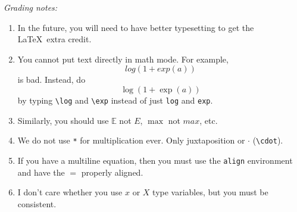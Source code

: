 \documentclass[10pt]{article}
\theoremstyle{definition}
\newcommand{\E}{\mathbb E}
\begin{document}
\noindent
\textit{Grading notes:}
\begin{enumerate}
    \item
In the future, you will need to have better typesetting to get the \LaTeX\ extra credit.
\item
    You cannot put text directly in math mode.  For example,
        \begin{equation}
            log(1+exp(a))
        \end{equation}
        is bad.  
        Instead, do
        \begin{equation}
            \log(1+\exp(a))
        \end{equation}
        by typing \texttt{\textbackslash log} and \texttt{\textbackslash exp} instead of just \texttt{log} and \texttt{exp}.
    \item
        Similarly, you should use $\E$ not $E$, $\max$ not $max$, etc.
    \item
        We do not use \texttt{*} for multiplication ever.  Only juxtaposition or $\cdot$ (\texttt{\textbackslash cdot}).
    \item 
        If you have a multiline equation, then you must use the \texttt{align} environment and have the $=$ properly aligned.
    \item 
        I don't care whether you use $x$ or $X$ type variables, but you must be consistent.
\end{enumerate}
\end{document}
